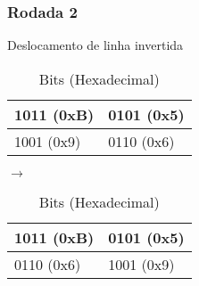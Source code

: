 \documentclass[
    article,            %
    11pt,               %
    oneside,            %
    a4paper,            %
    english,            %
    brazil,             %
    sumario=tradicional,
    ]{abntex2}
\begin{document}
\subsubsection{\textbf{Rodada 2}}
\label{subsub:rodada2-dec}

\label{subsubsub:deslocar-linha-round2-dec}

\begin{table}[H]
\centering
\caption{Deslocamento de linha invertida}
\label{tabela-desloc-linha-round2-dec}
\begin{tabular}{|l|l|}
\hline
1011 (0xB) & 0101 (0x5) \\ \hline
1001 (0x9) & 0110 (0x6) \\ \hline
\end{tabular}
$\longrightarrow$
\begin{tabular}{|l|l|}
\hline
1011 (0xB) & 0101 (0x5) \\ \hline
0110 (0x6) & 1001 (0x9) \\ \hline
\end{tabular}
\caption*{Bits (Hexadecimal)}
\end{table}

\label{subsubsub:substituicao-nibble-round2-dec}
\end{document}
